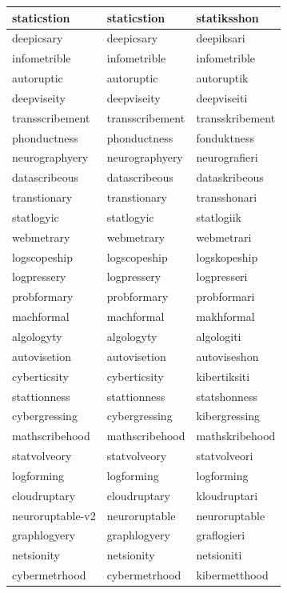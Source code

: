 \documentclass[10pt,twocolumn,letterpaper]{article}
\begin{document}
\begin{longtable}{|p{4cm}|p{4cm}|p{4cm}|}
staticstion & staticstion & statiksshon \\ \hline
deepicsary & deepicsary & deepiksari \\ \hline
infometrible & infometrible & infometrible \\ \hline
autoruptic & autoruptic & autoruptik \\ \hline
deepviseity & deepviseity & deepviseiti \\ \hline
transscribement & transscribement & transskribement \\ \hline
phonductness & phonductness & fonduktness \\ \hline
neurographyery & neurographyery & neurografieri \\ \hline
datascribeous & datascribeous & dataskribeous \\ \hline
transtionary & transtionary & transshonari \\ \hline
statlogyic & statlogyic & statlogiik \\ \hline
webmetrary & webmetrary & webmetrari \\ \hline
logscopeship & logscopeship & logskopeship \\ \hline
logpressery & logpressery & logpresseri \\ \hline
probformary & probformary & probformari \\ \hline
machformal & machformal & makhformal \\ \hline
algologyty & algologyty & algologiti \\ \hline
autovisetion & autovisetion & autoviseshon \\ \hline
cyberticsity & cyberticsity & kibertiksiti \\ \hline
stattionness & stattionness & statshonness \\ \hline
cybergressing & cybergressing & kibergressing \\ \hline
mathscribehood & mathscribehood & mathskribehood \\ \hline
statvolveory & statvolveory & statvolveori \\ \hline
logforming & logforming & logforming \\ \hline
cloudruptary & cloudruptary & kloudruptari \\ \hline
neuroruptable-v2 & neuroruptable & neuroruptable \\ \hline
graphlogyery & graphlogyery & graflogieri \\ \hline
netsionity & netsionity & netsioniti \\ \hline
cybermetrhood & cybermetrhood & kibermetthood \\ \hline

\end{longtable}
\end{document}
